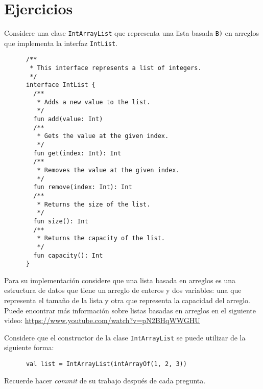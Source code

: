 \section{Ejercicios}
\label{sec:tdd:ejercicios}
  \begin{Exercise}[title={Listas}]
    Considere una clase \texttt{IntArrayList} que representa una lista basada \texttt{B)} en 
    arreglos que implementa la interfaz \texttt{IntList}.
    \begin{verbatim}
      /**
       * This interface represents a list of integers.
       */
      interface IntList {
        /**
         * Adds a new value to the list.
         */
        fun add(value: Int)
        /**
         * Gets the value at the given index.
         */
        fun get(index: Int): Int
        /**
         * Removes the value at the given index.
         */
        fun remove(index: Int): Int
        /**
         * Returns the size of the list.
         */
        fun size(): Int
        /**
         * Returns the capacity of the list.
         */
        fun capacity(): Int
      }
    \end{verbatim}

    Para su implementación considere que una lista basada en arreglos es una estructura de datos
    que tiene un arreglo de enteros y dos variables: una que representa el tamaño de la lista
    y otra que representa la capacidad del arreglo.
    Puede encontrar más información sobre listas basadas en arreglos en el siguiente video:
    \url{https://www.youtube.com/watch?v=pN2BHqWWGHU}

    Considere que el constructor de la clase \texttt{IntArrayList} se puede utilizar de la siguiente
    forma: 
    \begin{verbatim}
      val list = IntArrayList(intArrayOf(1, 2, 3))
    \end{verbatim}

    Recuerde hacer \textit{commit} de su trabajo después de cada pregunta.


\end{Exercise}
